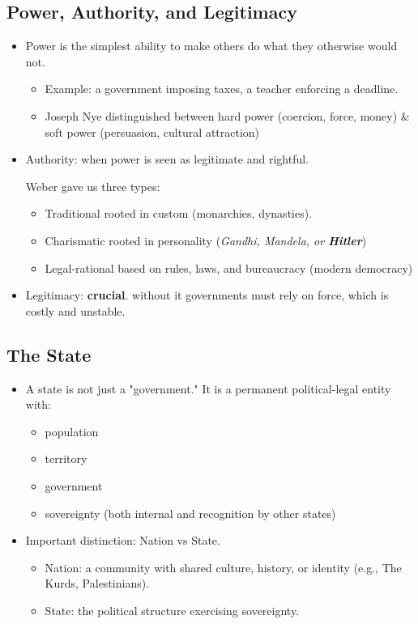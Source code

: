 \documentclass[11pt]{book}
\begin{document}
				\subsection{Power, Authority, and Legitimacy}
				
				\begin{itemize}
					\item Power is the simplest ability to make others do what they otherwise would not.
						\begin{itemize}
							\item Example: a government imposing taxes, a teacher enforcing a deadline.
							\item Joseph Nye distinguished between hard power (coercion, force, money) \& soft power (persuasion, cultural attraction)
						\end{itemize}
				\item Authority: when power is seen as legitimate and rightful.
				
				Weber gave us three types:
						\begin{itemize}
							\item Traditional \textemdash \space rooted in custom (monarchies, dynasties).
							\item Charismatic \textemdash \space rooted in personality (\textit {Gandhi, Mandela, or \textbf{Hitler}})
							\item Legal-rational \textemdash \space based on rules, laws, and bureaucracy (modern democracy)
						\end{itemize} 
			
				\item Legitimacy: \textbf{crucial}. without it governments must rely on force, which is costly and unstable.
			\end{itemize}
			
			\subsection{The State}
			\begin{itemize}
				\item A state is not just a "government." It is a permanent political-legal entity with: 
					\begin{itemize} 		
					\item population
					\item territory
					\item government
					\item sovereignty (both internal and recognition by other states)
					\end{itemize}
				\item Important distinction: Nation vs State.
					\begin{itemize}
					\item Nation: a community with shared culture, history, or identity (e.g., The Kurds, Palestinians).
					\item State: the political structure exercising sovereignty.
					\end{itemize}	
			\end{itemize}
			
\end{document}
